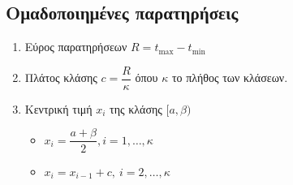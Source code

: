 \documentclass[a4paper,11pt,twoside]{article}
\begin{document}
\subsection{Ομαδοποιημένες παρατηρήσεις}
\begin{enumerate}[resume]
\item Εύρος παρατηρήσεων $ R=t_{\max}-t_{\min} $
\item Πλάτος κλάσης $ c=\dfrac{R}{\kappa} $ όπου $ \kappa $ το πλήθος των κλάσεων.
\item Κεντρική τιμή $x_i$ της κλάσης $ [a,\beta) $
\begin{multicols}{2}
\begin{itemize}
\item $ x_i=\dfrac{a+\beta}{2},i=1,\ldots,\kappa $
\item $x_i=x_{i-1}+c,\ i=2,\ldots,\kappa$
\end{itemize}
\end{multicols}
\end{enumerate}
\end{document}
